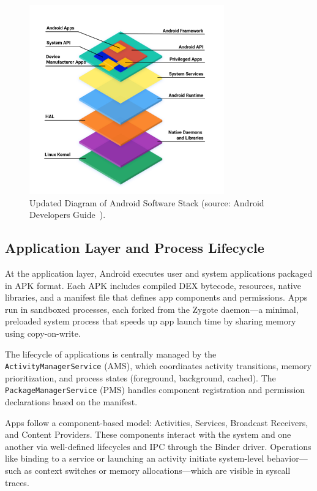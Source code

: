\documentclass[a4paper,12pt]{report}
\begin{document}
\begin{figure}[H]
    \centering
    \includegraphics[width=0.75\textwidth]{android_stack_diagram.png}
    \caption{Updated Diagram of Android Software Stack (source: Android Developers Guide~\cite{androidplatformdoc}).}
    \label{fig:android_stack}
\end{figure}

\subsection{Application Layer and Process Lifecycle}
At the application layer, Android executes user and system applications packaged in APK format. Each APK includes compiled DEX bytecode, resources, native libraries, and a manifest file that defines app components and permissions. Apps run in sandboxed processes, each forked from the Zygote daemon—a minimal, preloaded system process that speeds up app launch time by sharing memory using copy-on-write.

The lifecycle of applications is centrally managed by the \texttt{ActivityManagerService} (AMS), which coordinates activity transitions, memory prioritization, and process states (foreground, background, cached). The \texttt{PackageManagerService} (PMS) handles component registration and permission declarations based on the manifest.

Apps follow a component-based model: Activities, Services, Broadcast Receivers, and Content Providers. These components interact with the system and one another via well-defined lifecycles and IPC through the Binder driver. Operations like binding to a service or launching an activity initiate system-level behavior—such as context switches or memory allocations—which are visible in syscall traces.
\end{document}
